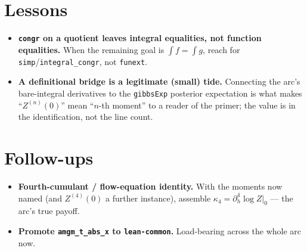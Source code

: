 \documentclass[11pt]{article}
\begin{document}
\section{Lessons}

\begin{itemize}[itemsep=3pt]
\item \textbf{\texttt{congr} on a quotient leaves integral equalities, not
  function equalities.} When the remaining goal is $\int f = \int g$, reach for
  \texttt{simp}/\texttt{integral\_congr}, not \texttt{funext}.
\item \textbf{A definitional bridge is a legitimate (small) tide.} Connecting
  the arc's bare-integral derivatives to the \texttt{gibbsExp} posterior
  expectation is what makes ``$Z^{(n)}(0)$'' mean ``$n$-th moment'' to a
  reader of the primer; the value is in the identification, not the line count.
\end{itemize}

\section{Follow-ups}

\begin{itemize}[itemsep=3pt]
\item \textbf{Fourth-cumulant / flow-equation identity.} With the moments now
  named (and $Z^{(4)}(0)$ a further instance), assemble
  $\kappa_4 = \partial_h^4 \log Z|_0$ --- the arc's true payoff.
\item \textbf{Promote \texttt{amgm\_t\_abs\_x} to \texttt{lean-common}.}
  Load-bearing across the whole arc now.
\end{itemize}
\end{document}
